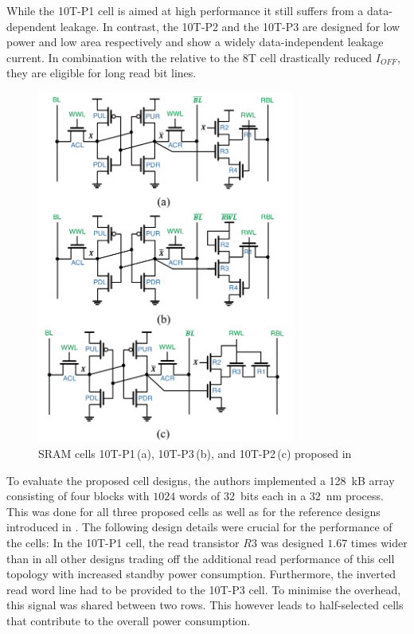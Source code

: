 \documentclass[conference]{IEEEtran}
\begin{document}
While the 10T-P1 cell is aimed at high performance it still suffers from a data-dependent leakage. In contrast, the 10T-P2 and the 10T-P3 are designed for low power and low area respectively and show a widely data-independent leakage current. In combination with the relative to the 8T cell drastically reduced $I_{OFF}$, they are eligible for long read bit lines.

\begin{figure}
	\centering
	\includegraphics[width=8.5cm]{cells_gupta.png}
	\caption{SRAM cells 10T-P1\,(a), 10T-P3\,(b), and 10T-P2\,(c) proposed in \cite{Gupta2019}}
	\label{fig:gupta}
\end{figure}

To evaluate the proposed cell designs, the authors implemented a \SI{128}{kB} array consisting of four blocks with $1024$ words of \SI{32}{bits} each in a \SI{32}{nm} process. This was done for all three proposed cells as well as for the reference designs introduced in \cite{Calhoun2007, Kim2008, Pasandi2015}. The following design details were crucial for the performance of the cells: In the 10T-P1 cell, the read transistor $R3$ was designed $1.67$ times wider than in all other designs trading off the additional read performance of this cell topology with increased standby power consumption. Furthermore, the inverted read word line had to be provided to the 10T-P3 cell. To minimise the overhead, this signal was shared between two rows. This however leads to half-selected cells that contribute to the overall power consumption.
\end{document}
